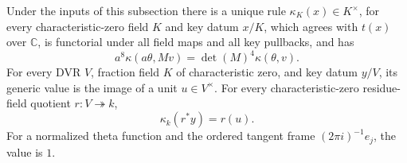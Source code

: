 \begin{srtheorem}
\label{thm:ftb-key-rule-exponent-one}
Under the inputs of this subsection there is a unique
rule \(\kappa_K(x)\in K^\times\), for every characteristic-zero
field \(K\) and key datum \(x/K\), which agrees with
\(t(x)\) over \(\mathbb C\), is functorial under all field
maps and all key pullbacks, and has
\[
                   a^8\kappa(a\theta,Mv)=\det(M)^4\kappa(\theta,v).
 \tag{S4}\label{eq:ftb-key-rule-exponent-one-homog}
\]
For every DVR \(V\), fraction field \(K\) of characteristic
zero, and key datum \(y/V\), its generic value is the
image of a unit \(u\in V^\times\).
For every characteristic-zero residue-field quotient
\(r:V\twoheadrightarrow k\),
\[
                                 \kappa_k(r^*y)=r(u).
 \tag{S5}\label{eq:ftb-key-rule-exponent-one-unit}
\]
For a normalized theta function and the ordered tangent
frame \((2\pi i)^{-1}e_j\), the value is \(1\).
\end{srtheorem}
